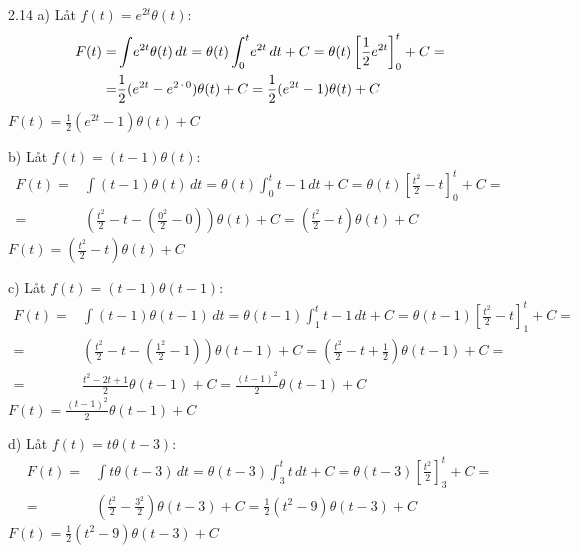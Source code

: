 \begin{task}{2.14 a)}
	Låt $f(t)=e^{2t}\theta(t)$:
	\begin{align*}
	F(t)=
	&\int \! e^{2t}\theta(t) \, dt=
	\theta(t)\int_{0}^{t} \! e^{2t} \, dt+C=
	\theta(t)\left[\frac{1}{2}e^{2t}\right]_{0}^{t}+C= \\ =
	&\frac{1}{2}(e^{2t}-e^{2\operatorname{\cdot}0})\theta(t)+C=
	\frac{1}{2}(e^{2t}-1)\theta(t)+C
	\end{align*}
	\ans $F(t)=\frac{1}{2}(e^{2t}-1)\theta(t)+C$
\end{task}

\begin{task}{b)}
	Låt $f(t)=(t-1)\theta(t)$:
	\begin{align*}
	F(t)=
	&\int \! (t-1)\theta(t) \, dt=
	\theta(t)\int_{0}^{t} \! t-1 \, dt+C=
	\theta(t)\left[\frac{t^2}{2}-t\right]_{0}^{t}+C= \\ =
	&\left(\frac{t^2}{2}-t-\left(\frac{0^2}{2}-0\right)\right)\theta(t)+C=
	\left(\frac{t^2}{2}-t\right)\theta(t)+C
	\end{align*}
	\ans $F(t)=(\frac{t^2}{2}-t)\theta(t)+C$
\end{task}

\begin{task}{c)}
	Låt $f(t)=(t-1)\theta(t-1)$:
	\begin{align*}
	F(t)=
	&\int \! (t-1)\theta(t-1) \, dt=
	\theta(t-1)\int_{1}^{t} \! t-1 \, dt+C=
	\theta(t-1)\left[\frac{t^2}{2}-t\right]_{1}^{t}+C= \\ =
	&\left(\frac{t^2}{2}-t-\left(\frac{1^2}{2}-1\right)\right)\theta(t-1)+C=
	\left(\frac{t^2}{2}-t+\frac{1}{2}\right)\theta(t-1)+C= \\ =
	&\frac{t^2-2t+1}{2}\theta(t-1)+C=
	\frac{(t-1)^2}{2}\theta(t-1)+C
	\end{align*}
	\ans $F(t)=\frac{(t-1)^2}{2}\theta(t-1)+C$
\end{task}

\begin{task}{d)}
	Låt $f(t)=t\theta(t-3)$:
	\begin{align*}
	F(t)=
	&\int \! t\theta(t-3) \, dt=
	\theta(t-3)\int_{3}^{t} \! t \, dt+C=
	\theta(t-3)\left[\frac{t^2}{2}\right]_{3}^{t}+C= \\ =
	&\left(\frac{t^2}{2}-\frac{3^2}{2}\right)\theta(t-3)+C=
	\frac{1}{2}\left(t^2-9\right)\theta(t-3)+C
	\end{align*}
	\ans $F(t)=\frac{1}{2}\left(t^2-9\right)\theta(t-3)+C$
\end{task}

